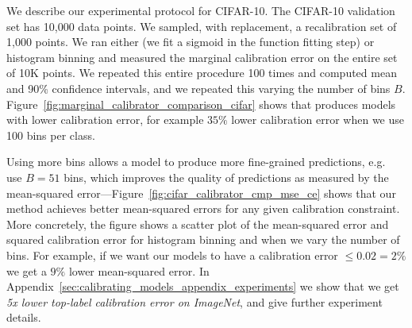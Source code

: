 We describe our experimental protocol for CIFAR-10.
The CIFAR-10 validation set has 10,000 data points. We sampled, with replacement, a recalibration set of 1,000 points. We ran either \ourcal{} (we fit a sigmoid in the function fitting step) or histogram binning and measured the marginal calibration error on the entire set of 10K points.
We repeated this entire procedure 100 times and computed mean and 90\% confidence intervals, and we repeated this varying the number of bins $B$. Figure~\ref{fig:marginal_calibrator_comparison_cifar} shows that \ourcal{} produces models with lower calibration error, for example $35\%$ lower calibration error when we use 100 bins per class.

Using more bins allows a model to produce more fine-grained predictions, e.g.~\cite{brocker2012empirical} use $B = 51$ bins, which improves the quality of predictions as measured by the mean-squared error---Figure~\ref{fig:cifar_calibrator_cmp_mse_ce} shows that our method achieves better mean-squared errors for any given calibration constraint.
More concretely, the figure shows a scatter plot of the mean-squared error and squared calibration error for histogram binning and \ourcal{} when we vary the number of bins. For example, if we want our models to have a calibration error $\leq 0.02 = 2\%$ we get a $9\%$ lower mean-squared error. In Appendix~\ref{sec:calibrating_models_appendix_experiments} we show that we get \emph{5x lower top-label calibration error on ImageNet}, and give further experiment details.

